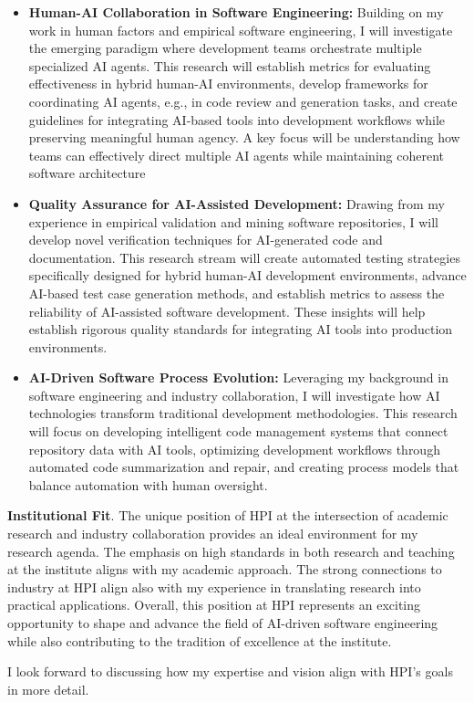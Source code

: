 \begin{itemize}
\item \textbf{Human-AI Collaboration in Software Engineering:} Building on my work in human factors and empirical software engineering, I will investigate the emerging paradigm where development teams orchestrate multiple specialized AI agents. This research will establish metrics for evaluating effectiveness in hybrid human-AI environments, develop frameworks for coordinating AI agents, e.g., in code review and generation tasks, and create guidelines for integrating AI-based tools into development workflows while preserving meaningful human agency. A key focus will be understanding how teams can effectively direct multiple AI agents while maintaining coherent software architecture
\item \textbf{Quality Assurance for AI-Assisted Development:} Drawing from my experience in empirical validation and mining software repositories, I will develop novel verification techniques for AI-generated code and documentation. This research stream will create automated testing strategies specifically designed for hybrid human-AI development environments, advance AI-based test case generation methods, and establish metrics to assess the reliability of AI-assisted software development. These insights will help establish rigorous quality standards for integrating AI tools into production environments.
\item \textbf{AI-Driven Software Process Evolution:} Leveraging my background in software engineering and industry collaboration, I will investigate how AI technologies transform traditional development methodologies. This research will focus on developing intelligent code management systems that connect repository data with AI tools, optimizing development workflows through automated code summarization and repair, and creating process models that balance automation with human oversight.
\end{itemize}

\textbf{Institutional Fit}. 
The unique position of HPI at the intersection of academic research and industry collaboration provides an ideal environment for my research agenda. 
The emphasis on high standards in both research and teaching at the institute aligns with my academic approach.
The strong connections to industry at HPI align also with my experience in translating research into practical applications. 
Overall, this position at HPI represents an exciting opportunity to shape and advance the field of AI-driven software engineering while also contributing to the tradition of excellence at the institute.

I look forward to discussing how my expertise and vision align with HPI's goals in more detail.